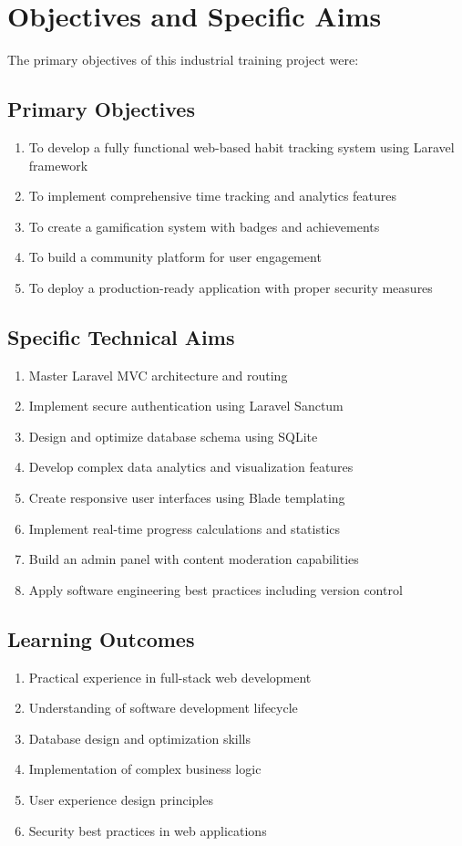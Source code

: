 \documentclass[12pt,a4paper]{report}
\newcommand{\JustifiedNormal}{\fontsize{12}{14}\selectfont\justifying\setlength{\parindent}{0pt}}
\begin{document}
\section{Objectives and Specific Aims}
\JustifiedNormal
The primary objectives of this industrial training project were:

\subsection{Primary Objectives}
\begin{enumerate}[leftmargin=*]
  \item To develop a fully functional web-based habit tracking system using Laravel framework
  \item To implement comprehensive time tracking and analytics features
  \item To create a gamification system with badges and achievements
  \item To build a community platform for user engagement
  \item To deploy a production-ready application with proper security measures
\end{enumerate}

\subsection{Specific Technical Aims}
\begin{enumerate}[leftmargin=*]
  \item Master Laravel MVC architecture and routing
  \item Implement secure authentication using Laravel Sanctum
  \item Design and optimize database schema using SQLite
  \item Develop complex data analytics and visualization features
  \item Create responsive user interfaces using Blade templating
  \item Implement real-time progress calculations and statistics
  \item Build an admin panel with content moderation capabilities
  \item Apply software engineering best practices including version control
\end{enumerate}

\subsection{Learning Outcomes}
\begin{enumerate}[leftmargin=*]
  \item Practical experience in full-stack web development
  \item Understanding of software development lifecycle
  \item Database design and optimization skills
  \item Implementation of complex business logic
  \item User experience design principles
  \item Security best practices in web applications
\end{enumerate}
\end{document}
